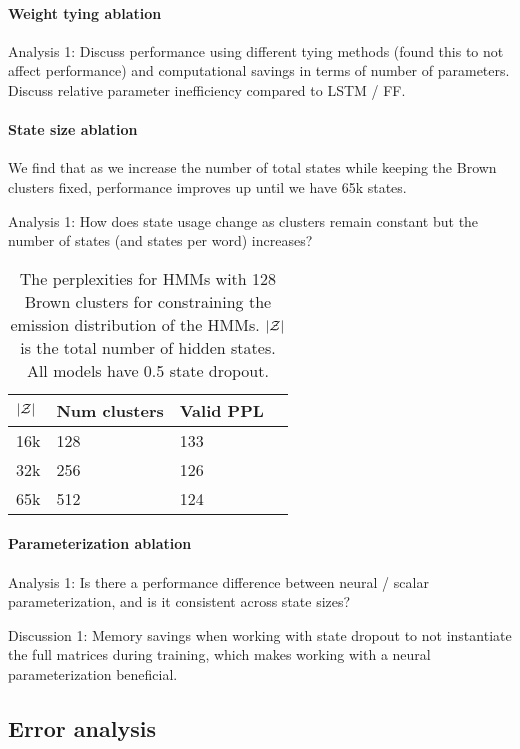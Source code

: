 \documentclass[11pt,a4paper]{article}
\begin{document}
\paragraph{Weight tying ablation}
Analysis 1: Discuss performance using different tying methods
(found this to not affect performance) and computational savings
in terms of number of parameters.
Discuss relative parameter inefficiency compared to LSTM / FF.

\paragraph{State size ablation}
We find that as we increase the number of total states
while keeping the Brown clusters fixed,
performance improves up until we have 65k states.

Analysis 1: How does state usage change as clusters remain constant
but the number of states (and states per word) increases?

\begin{table}[!t]
\centering
\caption{\label{tbl:ppl-states-ablation}
The perplexities for HMMs with 128 Brown clusters
for constraining the emission distribution of the HMMs.
$|\mathcal{Z}|$ is the total number of hidden states.
All models have 0.5 state dropout.
}

\begin{tabular}{llll}
\toprule
$|\mathcal{Z}|$ & Num clusters & Valid PPL\\
\midrule
16k      & 128          & 133\\
32k      & 256          & 126\\
65k      & 512          & 124\\
\bottomrule
\end{tabular}
\end{table}

\paragraph{Parameterization ablation}
Analysis 1: Is there a performance difference between neural / scalar parameterization,
and is it consistent across state sizes?

Discussion 1: Memory savings when working with state dropout to not instantiate the
full matrices during training, which makes working with a neural parameterization
beneficial.

\subsection{Error analysis}
\end{document}
